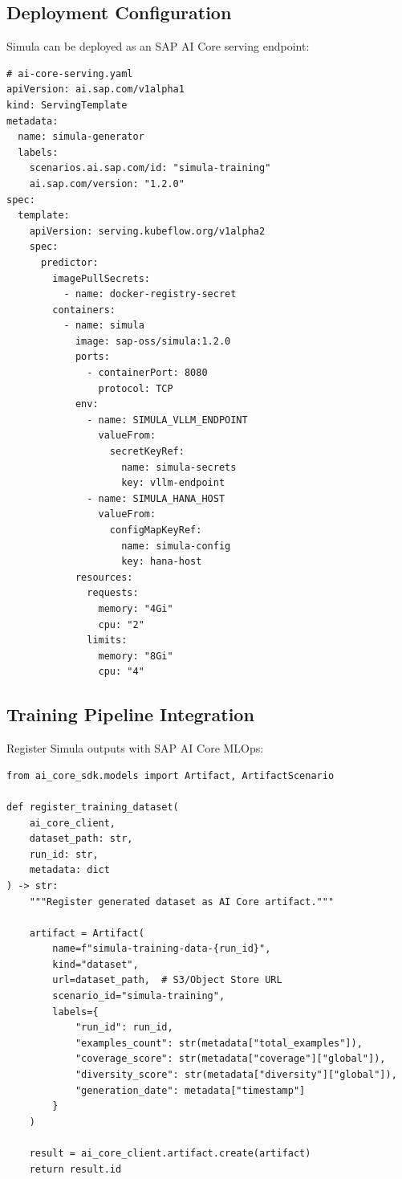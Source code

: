 \subsection{Deployment Configuration}

Simula can be deployed as an SAP AI Core serving endpoint:

\begin{lstlisting}[language=yamlx,caption={SAP AI Core serving configuration}]
# ai-core-serving.yaml
apiVersion: ai.sap.com/v1alpha1
kind: ServingTemplate
metadata:
  name: simula-generator
  labels:
    scenarios.ai.sap.com/id: "simula-training"
    ai.sap.com/version: "1.2.0"
spec:
  template:
    apiVersion: serving.kubeflow.org/v1alpha2
    spec:
      predictor:
        imagePullSecrets:
          - name: docker-registry-secret
        containers:
          - name: simula
            image: sap-oss/simula:1.2.0
            ports:
              - containerPort: 8080
                protocol: TCP
            env:
              - name: SIMULA_VLLM_ENDPOINT
                valueFrom:
                  secretKeyRef:
                    name: simula-secrets
                    key: vllm-endpoint
              - name: SIMULA_HANA_HOST
                valueFrom:
                  configMapKeyRef:
                    name: simula-config
                    key: hana-host
            resources:
              requests:
                memory: "4Gi"
                cpu: "2"
              limits:
                memory: "8Gi"
                cpu: "4"
\end{lstlisting}

\subsection{Training Pipeline Integration}

Register Simula outputs with SAP AI Core MLOps:

\begin{lstlisting}[language=jsonx,caption={Registering training data with AI Core}]
from ai_core_sdk.models import Artifact, ArtifactScenario

def register_training_dataset(
    ai_core_client,
    dataset_path: str,
    run_id: str,
    metadata: dict
) -> str:
    """Register generated dataset as AI Core artifact."""
    
    artifact = Artifact(
        name=f"simula-training-data-{run_id}",
        kind="dataset",
        url=dataset_path,  # S3/Object Store URL
        scenario_id="simula-training",
        labels={
            "run_id": run_id,
            "examples_count": str(metadata["total_examples"]),
            "coverage_score": str(metadata["coverage"]["global"]),
            "diversity_score": str(metadata["diversity"]["global"]),
            "generation_date": metadata["timestamp"]
        }
    )
    
    result = ai_core_client.artifact.create(artifact)
    return result.id
\end{lstlisting}


